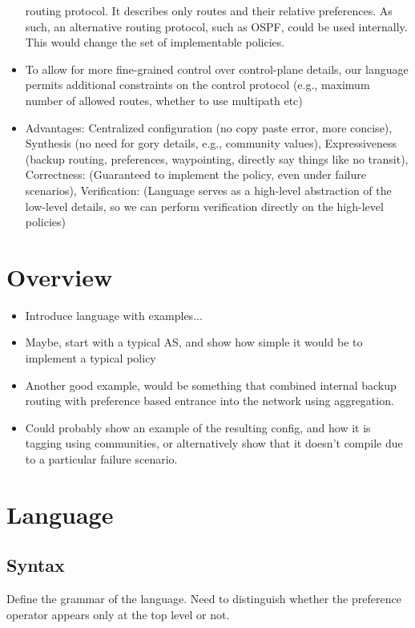 \documentclass{sigplanconf}
\begin{document}
\begin{itemize}
		  routing protocol. It describes only routes and their relative preferences. As such, an alternative routing protocol, such as OSPF, could 
		  be used internally. This would change the set of implementable policies.
	\item To allow for more fine-grained control over control-plane details, our language permits additional constraints on the control protocol
		  (e.g., maximum number of allowed routes, whether to use multipath etc)
	\item Advantages: Centralized configuration (no copy paste error, more concise), Synthesis (no need for gory details, e.g., community values),
		  Expressiveness (backup routing, preferences, waypointing, directly say things like no transit), 
		  Correctness: (Guaranteed to implement the policy, even under failure scenarios),
		  Verification: (Language serves as a high-level abstraction of the low-level details, so we can perform verification directly on the high-level policies)
\end{itemize}



\section{Overview}

\begin{itemize}
	\item Introduce language with examples...
	\item Maybe, start with a typical AS, and show how simple it would be to implement a typical policy
	\item Another good example, would be something that combined internal backup routing with preference based 
		  entrance into the network using aggregation.
	\item Could probably show an example of the resulting config, and how it is tagging using communities, 
		  or alternatively show that it doesn't compile due to a particular failure scenario.
\end{itemize}

\section{Language} 

\subsection{Syntax}
Define the grammar of the language.
Need to distinguish whether the preference operator 
appears only at the top level or not.
\end{document}
